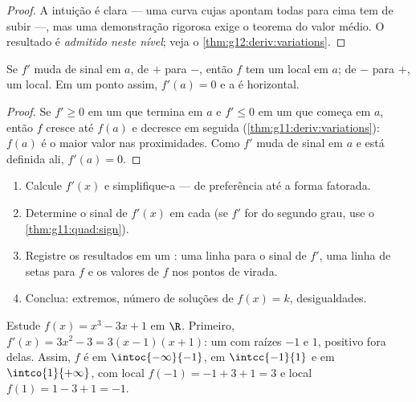 \begin{proof}
A intuição é clara --- uma curva cujas  apontam todas para cima
tem de subir ---, mas uma demonstração rigorosa exige o teorema do valor
médio. O resultado é \emph{admitido neste nível}; veja o
\cref{thm:g12:deriv:variations}.
\end{proof}

\begin{proposition}[Extremos]\label{prop:g11:deriv:extrema}
Se $f'$ muda de sinal em $a$, de $+$ para $-$, então $f$ tem um 
local em $a$; de $-$ para $+$, um  local. Em um ponto assim,
$f'(a) = 0$ e a  é horizontal.
\end{proposition}

\begin{proof}
Se $f' \geq 0$ em um  que termina em $a$ e $f' \leq 0$ em um
 que começa em $a$, então $f$ cresce até $f(a)$ e decresce em
seguida (\cref{thm:g11:deriv:variations}): $f(a)$ é o maior valor nas
proximidades. Como $f'$ muda de sinal em $a$ e está definida ali,
$f'(a) = 0$.
\end{proof}

\begin{method}\label{met:g11:deriv:study}
\begin{enumerate}
  \item Calcule $f'(x)$ e simplifique-a --- de preferência até a forma
        fatorada.
  \item Determine o sinal de $f'(x)$ em cada  (se $f'$ for do
        segundo grau, use o \cref{thm:g11:quad:sign}).
  \item Registre os resultados em um \emph{}: uma linha
        para o sinal de $f'$, uma linha de setas para $f$ e os valores de
        $f$ nos pontos de virada.
  \item Conclua: extremos, número de soluções de $f(x) = k$,
        desigualdades.
\end{enumerate}
\end{method}

\begin{example}\label{ex:g11:deriv:study}
Estude $f(x) = x^3 - 3x + 1$ em $\R$. Primeiro,
$f'(x) = 3x^2 - 3 = 3(x-1)(x+1)$: um  com raízes
$-1$ e $1$, positivo fora delas. Assim, $f$ é  em
$\intoc{-\infty}{-1}$,  em $\intcc{-1}{1}$ e  em
$\intco{1}{+\infty}$, com  local $f(-1) = -1 + 3 + 1 = 3$ e 
local $f(1) = 1 - 3 + 1 = -1$.
\end{example}

